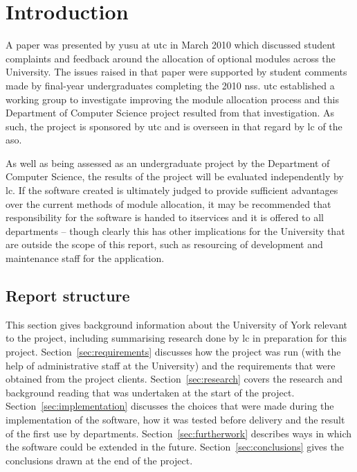
\section{Introduction}


A paper was presented by \gls{yusu} at \gls{utc} in March 2010 which discussed
student complaints and feedback around the allocation of optional modules
across the University. The issues raised in that paper were supported by
student comments made by final-year undergraduates completing the 2010
\gls{nss}. \gls{utc} established a working group to investigate improving the
module allocation process and this Department of Computer Science project
resulted from that investigation. As such, the project is sponsored by
\gls{utc} and is overseen in that regard by \gls{lc} of the \gls{aso}.

As well as being assessed as an undergraduate project by the Department of
Computer Science, the results of the project will be evaluated independently
by \gls{lc}. If the software created is ultimately judged to provide
sufficient advantages over the current methods of module allocation, it may be
recommended that responsibility for the software is handed to \gls{itservices}
and it is offered to all departments -- though clearly this has other
implications for the University that are outside the scope of this report,
such as resourcing of development and maintenance staff for the application.

\subsection{Report structure}

This section gives background information about the University of York
relevant to the project, including summarising research done by \gls{lc} in
preparation for this project. Section~\ref{sec:requirements} discusses how the
project was run (with the help of administrative staff at the University) and
the requirements that were obtained from the project clients.
Section~\ref{sec:research} covers the research and background reading that was
undertaken at the start of the project. Section~\ref{sec:implementation}
discusses the choices that were made during the implementation of the
software, how it was tested before delivery and the result of the first use by
departments. Section~\ref{sec:furtherwork} describes ways in which the
software could be extended in the future. Section~\ref{sec:conclusions} gives
the conclusions drawn at the end of the project.

